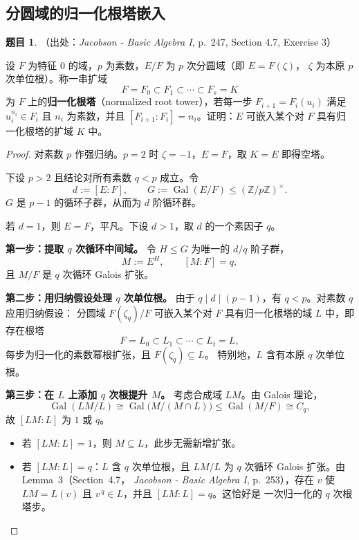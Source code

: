 \documentclass[a4paper]{ctexart}
\theoremstyle{definition}
\newtheorem{example}{题目}[section]
\theoremstyle{analysis}
\theoremstyle{plain}
\begin{document}
\subsection{\texorpdfstring{分圆域的归一化根塔嵌入}{分圆域的归一化根塔嵌入}}\label{subsec:problem-normalized-root-tower}

\begin{example}
（出处：\textit{Jacobson - Basic Algebra I}, p.~247, Section 4.7, Exercise 3）

设 \(F\) 为特征 \(0\) 的域，\(p\) 为素数，\(E/F\) 为 \(p\) 次分圆域（即 \(E=F(\zeta)\)，
\(\zeta\) 为本原 \(p\) 次单位根）。称一串扩域
\[
  F=F_0\subset F_1\subset\cdots\subset F_s=K
\]
为 \(F\) 上的\textbf{归一化根塔}（normalized root tower），若每一步
\(F_{i+1}=F_i(u_i)\) 满足 \(u_i^{n_i}\in F_i\) 且 \(n_i\) 为素数，并且
\([F_{i+1}:F_i]=n_i\)。证明：\(E\) 可嵌入某个对 \(F\) 具有归一化根塔的扩域 \(K\) 中。

\begin{proof}
对素数 \(p\) 作强归纳。\(p=2\) 时 \(\zeta=-1\)，\(E=F\)，取 \(K=E\) 即得空塔。

下设 \(p>2\) 且结论对所有素数 \(q<p\) 成立。令
\[
  d:=[E:F],\qquad G:=\operatorname{Gal}(E/F)\le(\mathbb Z/p\mathbb Z)^\times.
\]
\(G\) 是 \(p-1\) 的循环子群，从而为 \(d\) 阶循环群。

若 \(d=1\)，则 \(E=F\)，平凡。下设 \(d>1\)，取 \(d\) 的一个素因子 \(q\)。

\textbf{第一步：提取 \(q\) 次循环中间域。}
令 \(H\le G\) 为唯一的 \(d/q\) 阶子群，
\[
  M:=E^H,\qquad [M:F]=q,
\]
且 \(M/F\) 是 \(q\) 次循环 Galois 扩张。

\textbf{第二步：用归纳假设处理 \(q\) 次单位根。}
由于 \(q\mid d\mid(p-1)\)，有 \(q<p\)。对素数 \(q\) 应用归纳假设：
分圆域 \(F(\zeta_q)/F\) 可嵌入某个对 \(F\) 具有归一化根塔的域 \(L\) 中，即存在根塔
\[
  F=L_0\subset L_1\subset\cdots\subset L_t=L,
\]
每步为归一化的素数幂根扩张，且 \(F(\zeta_q)\subseteq L\)。
特别地，\(L\) 含有本原 \(q\) 次单位根。

\textbf{第三步：在 \(L\) 上添加 \(q\) 次根提升 \(M\)。}
考虑合成域 \(LM\)。由 Galois 理论，
\[
  \operatorname{Gal}(LM/L)\cong\operatorname{Gal}\bigl(M/(M\cap L)\bigr)
  \le\operatorname{Gal}(M/F)\cong C_q,
\]
故 \([LM:L]\) 为 \(1\) 或 \(q\)。

\begin{itemize}
  \item 若 \([LM:L]=1\)，则 \(M\subseteq L\)，此步无需新增扩张。
  \item 若 \([LM:L]=q\)：\(L\) 含 \(q\) 次单位根，且 \(LM/L\) 为 \(q\) 次循环
  Galois 扩张。由 Lemma~3（Section~4.7，
  \textit{Jacobson - Basic Algebra I}, p.~253），存在 \(v\) 使
  \(LM=L(v)\) 且 \(v^{\,q}\in L\)，并且 \([LM:L]=q\)。这恰好是
  一次归一化的 \(q\) 次根塔步。
\end{itemize}


\end{proof}
\end{example}
\end{document}
